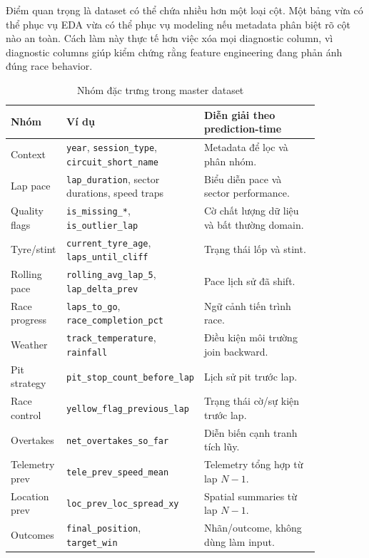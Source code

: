 \documentclass[conference]{IEEEtran}
\begin{document}
Điểm quan trọng là dataset có thể chứa nhiều hơn một loại cột. Một bảng vừa có thể phục vụ EDA vừa có thể phục vụ modeling nếu metadata phân biệt rõ cột nào an toàn. Cách làm này thực tế hơn việc xóa mọi diagnostic column, vì diagnostic columns giúp kiểm chứng rằng feature engineering đang phản ánh đúng race behavior.

\begin{table}[htbp]
\caption{Nhóm đặc trưng trong master dataset}
\label{tab:featuregroups}
\centering
\begin{tabular}{p{0.18\linewidth}p{0.30\linewidth}p{0.38\linewidth}}
\toprule
Nhóm & Ví dụ & Diễn giải theo prediction-time \\
\midrule
Context & \texttt{year}, \texttt{session\_type}, \texttt{circuit\_short\_name} & Metadata để lọc và phân nhóm. \\
Lap pace & \texttt{lap\_duration}, sector durations, speed traps & Biểu diễn pace và sector performance. \\
Quality flags & \texttt{is\_missing\_*}, \texttt{is\_outlier\_lap} & Cờ chất lượng dữ liệu và bất thường domain. \\
Tyre/stint & \texttt{current\_tyre\_age}, \texttt{laps\_until\_cliff} & Trạng thái lốp và stint. \\
Rolling pace & \texttt{rolling\_avg\_lap\_5}, \texttt{lap\_delta\_prev} & Pace lịch sử đã shift. \\
Race progress & \texttt{laps\_to\_go}, \texttt{race\_completion\_pct} & Ngữ cảnh tiến trình race. \\
Weather & \texttt{track\_temperature}, \texttt{rainfall} & Điều kiện môi trường join backward. \\
Pit strategy & \texttt{pit\_stop\_count\_before\_lap} & Lịch sử pit trước lap. \\
Race control & \texttt{yellow\_flag\_previous\_lap} & Trạng thái cờ/sự kiện trước lap. \\
Overtakes & \texttt{net\_overtakes\_so\_far} & Diễn biến cạnh tranh tích lũy. \\
Telemetry prev & \texttt{tele\_prev\_speed\_mean} & Telemetry tổng hợp từ lap \(N-1\). \\
Location prev & \texttt{loc\_prev\_loc\_spread\_xy} & Spatial summaries từ lap \(N-1\). \\
Outcomes & \texttt{final\_position}, \texttt{target\_win} & Nhãn/outcome, không dùng làm input. \\
\bottomrule
\end{tabular}
\end{table}
\end{document}
